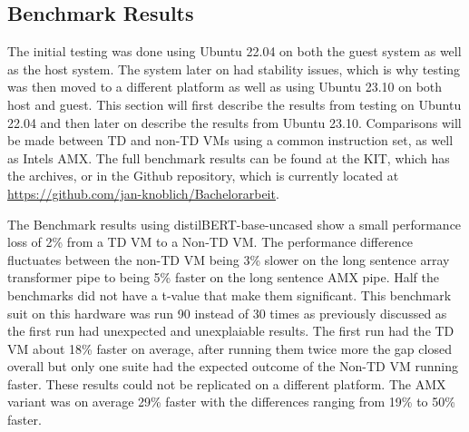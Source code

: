 \subsection{Benchmark Results}
The initial testing was done using Ubuntu 22.04 on both the guest system as well as the host system. The system later on had stability issues, which is why testing was then moved to a different platform as well as using Ubuntu 23.10 on both host and guest. This section will first describe the results from testing on Ubuntu 22.04 and then later on describe the results from Ubuntu 23.10. Comparisons will be made between TD and non-TD VMs using a common instruction set, as well as Intels AMX. The full benchmark results can be found at the KIT, which has the archives, or in the Github repository, which is currently located at \url{https://github.com/jan-knoblich/Bachelorarbeit}.


The Benchmark results using distilBERT-base-uncased show a small performance loss of 2\% from a TD VM to a Non-TD VM. The performance difference fluctuates between the non-TD VM being 3\% slower on the long sentence array transformer pipe to being 5\% faster on the long sentence AMX pipe. Half the benchmarks did not have a t-value that make them significant. This benchmark suit on this hardware was run 90 instead of 30 times as previously discussed as the first run had unexpected and unexplaiable results. The first run had the TD VM about 18\% faster on average, after running them twice more the gap closed overall but only one suite had the expected outcome of the Non-TD VM running faster. These results could not be replicated on a different platform. The AMX variant was on average 29\% faster with the differences ranging from 19\% to 50\% faster.

